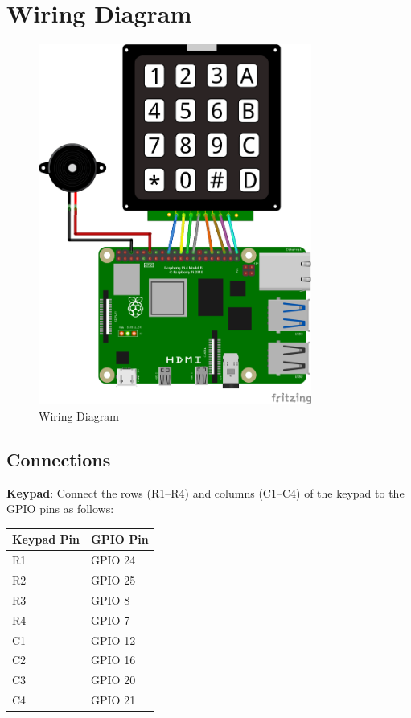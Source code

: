 \documentclass{article}
\begin{document}
	\section*{Wiring Diagram}
	\begin{figure}[H]
		\centering
		\includegraphics[width=0.8\textwidth]{09b-keypad-piezo.png} %
		\caption{Wiring Diagram}
	\end{figure}
	
	\newpage
	\subsection*{Connections}
	\textbf{Keypad}: Connect the rows (R1–R4) and columns (C1–C4) of the keypad to the GPIO pins as follows:
	
	\begin{center}
		\begin{tabular}{|l|l|}
			\hline
			\textbf{Keypad Pin} & \textbf{GPIO Pin} \\
			\hline
			R1 & GPIO 24 \\
			R2 & GPIO 25 \\
			R3 & GPIO 8  \\
			R4 & GPIO 7  \\
			C1 & GPIO 12 \\
			C2 & GPIO 16 \\
			C3 & GPIO 20 \\
			C4 & GPIO 21 \\
			\hline
		\end{tabular}
	\end{center}
	
\end{document}
